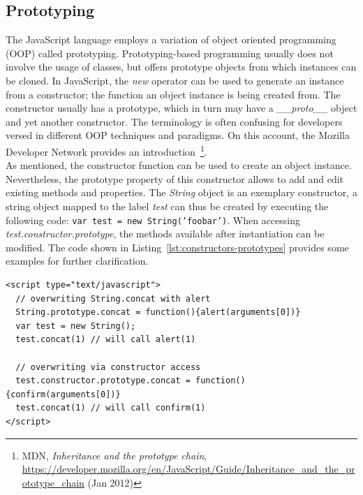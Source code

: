     \subsection{Prototyping}
    \label{subsubsec:6.2.3.prototyping}

    The JavaScript language employs a variation of object oriented programming (OOP) called prototyping. Prototyping-based programming usually does not involve the usage of classes, but offers prototype objects from which instances can be cloned. In JavaScript, the \textit{new} operator can be used to generate an instance from a constructor; the function an object instance is being created from. The constructor usually has a prototype, which in turn may have a \textit{\_\_proto\_\_} object and yet another constructor. The terminology is often confusing for developers versed in different OOP techniques and paradigms. On this account, the Mozilla Developer Network provides an introduction~\footnote{MDN, \textit{Inheritance and the prototype chain}, \url{https://developer.mozilla.org/en/JavaScript/Guide/Inheritance_and_the_prototype_chain} (Jan 2012)}.\\

    As mentioned, the constructor function can be used to create an object instance. Nevertheless, the prototype property of this constructor allows to add and edit existing methods and properties. The \textit{String} object is an exemplary constructor, a string object mapped to the label \textit{test} can thus be created by executing the following code: \texttt{var test = new String('foobar')}. When accessing \textit{test.constructor.prototype}, the methods available after instantiation can be modified. The code shown in Listing~\ref{lst:constructors-prototypes} provides some examples for further clarification.

\begin{lstlisting}[captionpos=b,label=lst:constructors-prototypes,caption=Examples for constructor and prototype usage in JavaScript; the prototype is being accessed and manipulated to replace concat() with alert()]
<script type="text/javascript">
  // overwriting String.concat with alert
  String.prototype.concat = function(){alert(arguments[0])}
  var test = new String();
  test.concat(1) // will call alert(1)
  
  // overwriting via constructor access
  test.constructor.prototype.concat = function(){confirm(arguments[0])}
  test.concat(1) // will call confirm(1)
</script>
\end{lstlisting}   

